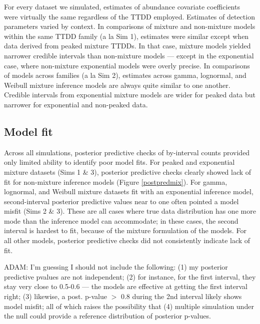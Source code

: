 \documentclass[useAMS,usenatbib,referee,12pt]{article}
\newcommand{\adam}[1]{{\color{blue} ADAM: #1}}
\begin{document}
For every dataset we simulated, estimates of abundance covariate coefficients were virtually the same regardless of the TTDD employed.  
Estimates of detection parameters varied by context.  
In comparisons of mixture and non-mixture models within the same TTDD family (a la Sim 1), estimates were similar except when data derived from peaked mixture TTDDs.  
In that case, mixture models yielded narrower credible intervals than non-mixture models --- except in the exponential case, where non-mixture exponential models were overly precise.  
In comparisons of models across families (a la Sim 2), estimates across gamma, lognormal, and Weibull mixture inference models are always quite similar to one another.  
Credible intervals from exponential mixture models are wider for peaked data but narrower for exponential and non-peaked data.  



\subsection{Model fit}\label{sec:modelfit}

Across all simulations, posterior predictive checks of by-interval counts provided only limited ability to identify poor model fits.  
For peaked and exponential mixture datasets (Sims 1 \& 3), posterior predictive checks clearly showed lack of fit for non-mixture inference models (Figure \ref{postpredmix}).  
For gamma, lognormal, and Weibull mixture datasets fit with an exponential inference model, second-interval posterior predictive values near to one often pointed a model misfit (Sims 2 \& 3).  
These are all cases where true data distribution has one more mode than the inference model can accommodate; in these cases, the second interval is hardest to fit, because of the mixture formulation of the models.  
For all other models, posterior predictive checks did not consistently indicate lack of fit.

\adam{I'm guessing I should not include the following: (1) my posterior predictive pvalues are not independent; (2) for instance, for the first interval, they stay very close to 0.5-0.6 --- the models are effective at getting the first interval right; (3) likewise, a post. p-value $>$ 0.8 during the 2nd interval likely shows model misfit; all of which raises the possibility that (4) multiple simulation under the null could provide a reference distribution of posterior p-values.}
\end{document}
